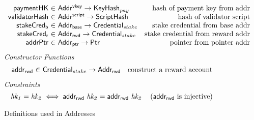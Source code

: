 \begin{figure*}[hbt]
  \begin{equation*}
    \begin{array}{r@{~\in~}lr}
      \fun{paymentHK} & \AddrVKey \to \KeyHash_{pay}
      & \text{hash of payment key from addr}\\
      \fun{validatorHash} & \AddrScr \to \HashScr & \text{hash of validator
                                                    script} \\
            \fun{stakeCred_{b}} & \AddrB \to
                          \StakeCredential & \text{stake credential from base
                                      addr}\\
      \fun{stakeCred_{r}} & \AddrRWD \to \StakeCredential & \text{stake credential
                                                   from reward addr}\\
      \fun{addrPtr} & \AddrP \to \Ptr
                    & \text{pointer from pointer addr}\\
    \end{array}
  \end{equation*}
  \emph{Constructor Functions}
  \begin{equation*}
    \begin{array}{r@{~\in~}lr}
      \fun{addr_{rwd}}
        & \Credential_{stake} \to \AddrRWD
        & \text{construct a reward account}
    \end{array}
  \end{equation*}
  \emph{Constraints}
  \begin{equation*}
    \mathit{hk_1} = \mathit{hk_2} \iff \mathsf{addr_{rwd}}~\mathit{hk_2} = \mathsf{addr_{rwd}}~\mathit{hk_2}
    ~~~ \left( \mathsf{addr_{rwd}} \text{ is injective} \right)
  \end{equation*}
  \caption{Definitions used in Addresses}
  \label{fig:defs:addresses}
\end{figure*}

\clearpage
